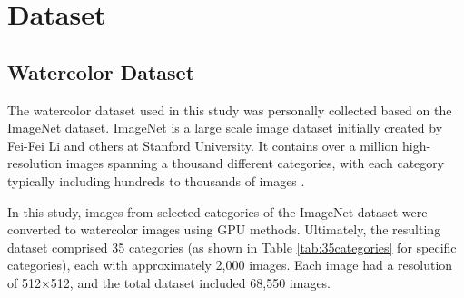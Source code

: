 \documentclass[12pt]{report}
\begin{document}
\chapter{Dataset}
\section{Watercolor Dataset}
The watercolor dataset used in this study was personally collected based on the ImageNet dataset. ImageNet is a large scale image dataset initially created by Fei-Fei Li and others at Stanford University. It contains over a million high-resolution images spanning a thousand different categories, with each category typically including hundreds to thousands of images \cite{deng2009imagenet}. 

In this study, images from selected categories of the ImageNet dataset were converted to watercolor images using GPU methods. Ultimately, the resulting dataset comprised 35 categories (as shown in Table \ref{tab:35categories} for specific categories), each with approximately 2,000 images. Each image had a resolution of 512$\times$512, and the total dataset included 68,550 images.
\end{document}
